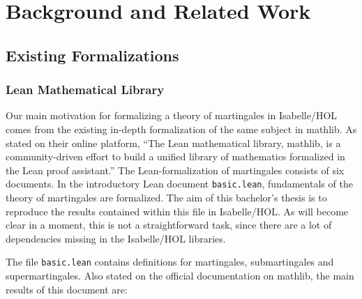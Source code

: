 ﻿%

\chapter{Background and Related Work}\label{chapter:background}

\section{Existing Formalizations}
\subsection{Lean Mathematical Library}
Our main motivation for formalizing a theory of martingales in Isabelle/HOL comes from the existing in-depth formalization of the same subject in \textsf{mathlib}. As stated on their online platform, ``The Lean mathematical library, \textsf{mathlib}, is a community-driven effort to build a unified library of mathematics formalized in the Lean proof assistant.'' The Lean-formalization of martingales consists of six documents. In the introductory Lean document \lstinline{basic.lean}, fundamentals of the theory of martingales are formalized. The aim of this bachelor's thesis is to reproduce the results contained within this file in Isabelle/HOL. As will become clear in a moment, this is not a straightforward task, since there are a lot of dependencies missing in the Isabelle/HOL libraries.

The file \lstinline{basic.lean} contains definitions for martingales, submartingales and supermartingales. Also stated on the official documentation on \textsf{mathlib}, the main results of this document are:



